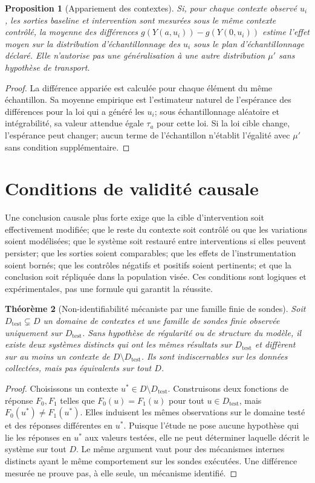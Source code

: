 \documentclass[11pt,oneside]{book}
\newtheorem{theoreme}{Théorème}[chapter]
\newtheorem{proposition}[theoreme]{Proposition}
\theoremstyle{definition}
\theoremstyle{remark}
\newcommand{\1}{\mathbf 1}
\begin{document}
\begin{proposition}[Appariement des contextes]
Si, pour chaque contexte observé $u_i$, les sorties baseline et intervention sont mesurées sous le même contexte contrôlé, la moyenne des différences $g(Y(a,u_i))-g(Y(0,u_i))$ estime l'effet moyen sur la distribution d'échantillonnage des $u_i$ sous le plan d'échantillonnage déclaré. Elle n'autorise pas une généralisation à une autre distribution $\mu'$ sans hypothèse de transport.
\end{proposition}
\begin{proof}
La différence appariée est calculée pour chaque élément du même échantillon. Sa moyenne empirique est l'estimateur naturel de l'espérance des différences pour la loi qui a généré les $u_i$; sous échantillonnage aléatoire et intégrabilité, sa valeur attendue égale $\tau_a$ pour cette loi. Si la loi cible change, l'espérance peut changer; aucun terme de l'échantillon n'établit l'égalité avec $\mu'$ sans condition supplémentaire.
\end{proof}

\section{Conditions de validité causale}
Une conclusion causale plus forte exige que la cible d'intervention soit effectivement modifiée; que le reste du contexte soit contrôlé ou que les variations soient modélisées; que le système soit restauré entre interventions si elles peuvent persister; que les sorties soient comparables; que les effets de l'instrumentation soient bornés; que les contrôles négatifs et positifs soient pertinents; et que la conclusion soit répliquée dans la population visée. Ces conditions sont logiques et expérimentales, pas une formule qui garantit la réussite.

\begin{theoreme}[Non-identifiabilité mécaniste par une famille finie de sondes]
Soit $D_{\mathrm{test}}\subsetneq D$ un domaine de contextes et une famille de sondes finie observée uniquement sur $D_{\mathrm{test}}$. Sans hypothèse de régularité ou de structure du modèle, il existe deux systèmes distincts qui ont les mêmes résultats sur $D_{\mathrm{test}}$ et diffèrent sur au moins un contexte de $D\setminus D_{\mathrm{test}}$. Ils sont indiscernables sur les données collectées, mais pas équivalents sur tout $D$.
\end{theoreme}
\begin{proof}
Choisissons un contexte $u^*\in D\setminus D_{\mathrm{test}}$. Construisons deux fonctions de réponse $F_0,F_1$ telles que $F_0(u)=F_1(u)$ pour tout $u\in D_{\mathrm{test}}$, mais $F_0(u^*)\neq F_1(u^*)$. Elles induisent les mêmes observations sur le domaine testé et des réponses différentes en $u^*$. Puisque l'étude ne pose aucune hypothèse qui lie les réponses en $u^*$ aux valeurs testées, elle ne peut déterminer laquelle décrit le système sur tout $D$. Le même argument vaut pour des mécanismes internes distincts ayant le même comportement sur les sondes exécutées.
 Une différence mesurée ne prouve pas, à elle seule, un mécanisme identifié.
\end{proof}
\end{document}
